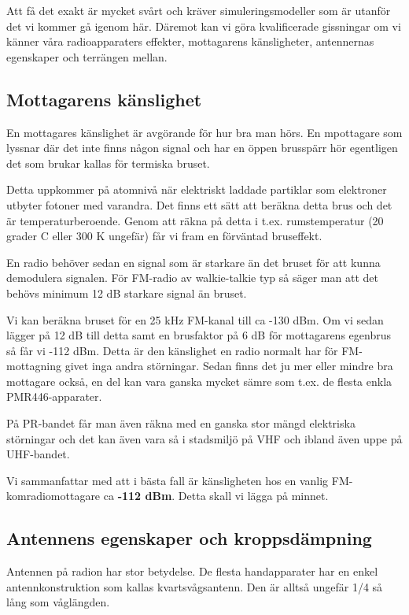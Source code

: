 Att få det exakt är mycket svårt och kräver simuleringsmodeller som är utanför det vi kommer gå igenom här. Däremot kan vi göra kvalificerade gissningar om vi känner våra radioapparaters effekter, mottagarens känsligheter, antennernas egenskaper och terrängen mellan.

\subsection{Mottagarens känslighet}

En mottagares känslighet är avgörande för hur bra man hörs. En mpottagare som lyssnar där det inte finns någon signal och har en öppen brusspärr hör egentligen det som brukar kallas för termiska bruset.

Detta uppkommer på atomnivå när elektriskt laddade partiklar som elektroner utbyter fotoner med varandra. Det finns ett sätt att beräkna detta brus och det är temperaturberoende. Genom att räkna på detta i t.ex. rumstemperatur (20 grader C eller 300 K ungefär) får vi fram en förväntad bruseffekt.

En radio behöver sedan en signal som är starkare än det bruset för att kunna demodulera signalen. För FM-radio av walkie-talkie typ så säger man att det behövs minimum 12 dB starkare signal än bruset.

Vi kan beräkna bruset för en 25 kHz FM-kanal till ca -130 dBm. Om vi sedan lägger på 12 dB till detta samt en brusfaktor på 6 dB för mottagarens egenbrus så får vi -112 dBm. Detta är den känslighet en radio normalt har för FM-mottagning givet inga andra störningar. Sedan finns det ju mer eller mindre bra mottagare också, en del kan vara ganska mycket sämre som t.ex. de flesta enkla PMR446-apparater.

På PR-bandet får man även räkna med en ganska stor mängd elektriska störningar och det kan även vara så i stadsmiljö på VHF och ibland även uppe på UHF-bandet.

Vi sammanfattar med att i bästa fall är känsligheten hos en vanlig FM-komradiomottagare ca \textbf{-112 dBm}. Detta skall vi lägga på minnet.

\subsection{Antennens egenskaper och kroppsdämpning}

Antennen på radion har stor betydelse. De flesta handapparater har en enkel antennkonstruktion som kallas kvartsvågsantenn. Den är alltså ungefär 1/4 så lång som våglängden. 


